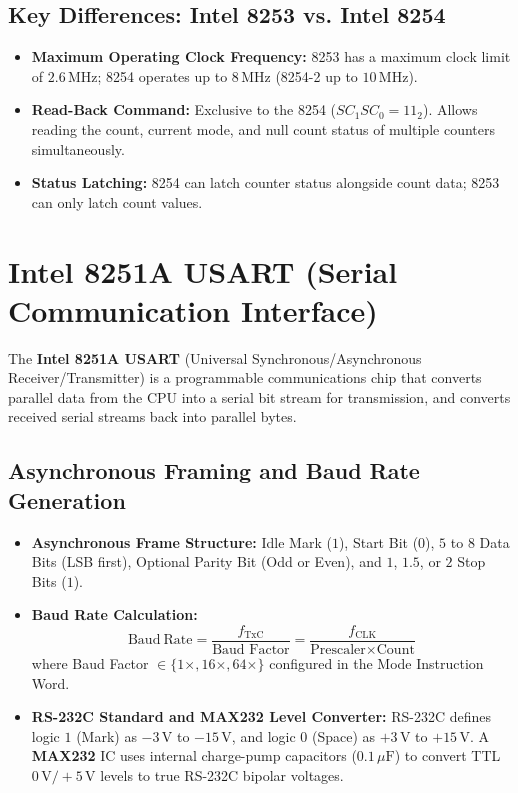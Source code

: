 \documentclass[12pt,a4paper]{article}
\begin{document}
\subsection{Key Differences: Intel 8253 vs. Intel 8254}
\begin{itemize}[leftmargin=*]
  \item \textbf{Maximum Operating Clock Frequency:} 8253 has a maximum clock limit of $2.6\,\mathrm{MHz}$; 8254 operates up to $8\,\mathrm{MHz}$ (8254-2 up to $10\,\mathrm{MHz}$).
  \item \textbf{Read-Back Command:} Exclusive to the 8254 ($SC_1SC_0 = 11_2$). Allows reading the count, current mode, and null count status of multiple counters simultaneously.
  \item \textbf{Status Latching:} 8254 can latch counter status alongside count data; 8253 can only latch count values.
\end{itemize}

\section{Intel 8251A USART (Serial Communication Interface)}

\begin{tcolorbox}[defbox, title={Intel 8251A USART Overview}]
The \textbf{Intel 8251A USART} (Universal Synchronous/Asynchronous Receiver/Transmitter) is a programmable communications chip that converts parallel data from the CPU into a serial bit stream for transmission, and converts received serial streams back into parallel bytes.
\end{tcolorbox}

\subsection{Asynchronous Framing and Baud Rate Generation}
\begin{itemize}[leftmargin=*]
  \item \textbf{Asynchronous Frame Structure:} Idle Mark ($1$), Start Bit ($0$), $5$ to $8$ Data Bits (LSB first), Optional Parity Bit (Odd or Even), and $1$, $1.5$, or $2$ Stop Bits ($1$).
  \item \textbf{Baud Rate Calculation:}
  \[
  \mathbf{\mathrm{Baud\ Rate}} = \frac{f_{\mathrm{TxC}}}{\text{Baud Factor}} = \frac{f_{\mathrm{CLK}}}{\text{Prescaler} \times \text{Count}}
  \]
  where Baud Factor $\in \{1\times, 16\times, 64\times\}$ configured in the Mode Instruction Word.
  \item \textbf{RS-232C Standard and MAX232 Level Converter:}
  RS-232C defines logic $1$ (Mark) as $-3\,\mathrm{V}$ to $-15\,\mathrm{V}$, and logic $0$ (Space) as $+3\,\mathrm{V}$ to $+15\,\mathrm{V}$. A \textbf{MAX232} IC uses internal charge-pump capacitors ($0.1\,\mu\mathrm{F}$) to convert TTL $0\,\mathrm{V}/+5\,\mathrm{V}$ levels to true RS-232C bipolar voltages.
\end{itemize}
\end{document}
